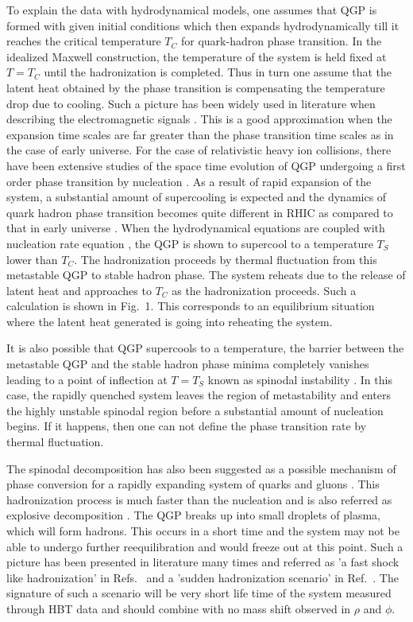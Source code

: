 \documentclass[aps,prc,preprint,superscriptaddress,showpacs,showkeys]{revtex4-1}
\begin{document}
  To explain the data with hydrodynamical models, one assumes that QGP 
is formed with given initial conditions which then expands
hydrodynamically till it reaches the critical temperature $T_C$ for 
quark-hadron phase transition.
  In the idealized Maxwell construction, the temperature of the system 
is held fixed at $T=T_C$ until the hadronization is completed. 
Thus in turn one assume that the latent heat obtained by the phase 
transition is compensating the temperature drop due to cooling.
Such a picture has been widely used in literature when describing
the electromagnetic signals \cite{SRIVASTAVA}.
  This is a good approximation when the expansion time scales are far 
greater than the phase transition time scales as in the case of early 
universe. 
  For the case of relativistic heavy ion collisions, there have
been extensive studies of the space time evolution of 
QGP undergoing a first order phase transition by nucleation
\cite{CSER,SHUK,INHOMO,ZABPC}.
  As a result of rapid expansion of the system, a substantial amount of 
supercooling is expected and the dynamics of quark hadron phase 
transition becomes quite different in RHIC as compared to that 
in early universe \cite{INHOMO,AKM}. 
 When the hydrodynamical equations are coupled with nucleation rate 
equation \cite{INHOMO}, the QGP is shown to supercool to a temperature 
$T_S$ lower than $T_C$. The hadronization proceeds by thermal fluctuation
from this metastable QGP to stable hadron phase. The system 
reheats due to the release of latent heat and approaches to $T_C$ as 
the hadronization proceeds. Such a calculation is shown in Fig.~1.
This corresponds to an equilibrium situation where the latent heat 
generated is going into reheating the system. 

It is also possible that QGP supercools to a temperature,
the barrier between the metastable QGP and the stable hadron phase minima 
completely vanishes leading to a point of inflection at $T=T_S$ known as 
spinodal instability \cite{SPINO}. In this case, the rapidly quenched system 
leaves the region of metastability and enters the highly unstable spinodal 
region before a substantial amount of nucleation begins.
If it happens, then one can not define the phase transition rate by 
thermal fluctuation.

   The spinodal decomposition has also been suggested as a
possible mechanism of phase conversion for a rapidly expanding system of 
quarks and gluons \cite{SPINO,DUMHEP,DUMPRL}. This hadronization process
is much faster than the nucleation and is  
also referred as explosive decomposition \cite{DUMEXP}.
 The QGP breaks up into small droplets of plasma, which will form hadrons. 
 This occurs in a short time and the system may not be able to undergo 
further reequilibration and would freeze out at this point. 
  Such a picture has been presented in literature many times
and referred as 'a fast shock like hadronization' in 
Refs.~\cite{CSORGO} and a 'sudden hadronization scenario' in 
Ref.~\cite{RAFEL}.
  The signature of such a scenario will be very short life time 
\cite{CSERNAI} of the system measured through HBT data \cite{NA49,PHEN} 
and should combine with no mass shift observed in $\rho$ and $\phi$.
\end{document}
